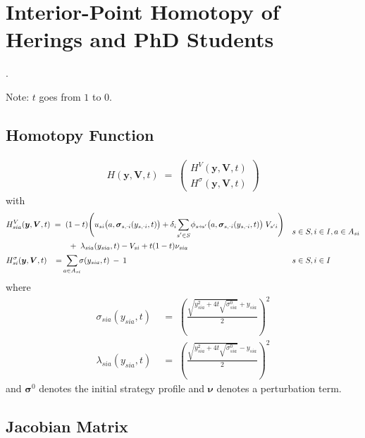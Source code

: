 \documentclass[11pt,fleqn]{article}
\newcommand{\bsigma}{\bm{\sigma}}
\newcommand{\bV}{\bm{V}}
\newcommand{\bnu}{\bm{\nu}}
\newcommand{\by}{\bm{y}}
\newcommand{\shortminus}{{\text{\scalebox{0.4}[1.0]{\(-\)}}}}
\newcommand{\minusi}{\shortminus i}
\newcommand{\shortrightarrow}{\parbox{4pt}{\tikz{\draw[->](0,0)--(4pt,0);}}}
\newcommand{\phiss}{\phi_{s\shortrightarrow s'}}
\begin{document}
\newpage
\section{Interior-Point Homotopy of Herings and PhD Students}

\citep*{Heringsetal2021}.

Note: $t$ goes from $1$ to $0$.

\subsection*{Homotopy Function}

\begin{align*}
	H(\by,\bV,t) \;=\;
	\begin{pmatrix} 
		H^{V}(\by,\bV,t) \\ 
		H^{\sigma}(\by,\bV,t) 
	\end{pmatrix}
\end{align*}
with
\begin{align*}
	& \begin{aligned}
		H^V_{sia}(\by,\bV,t) & \;=\; (1-t) \Biggl( u_{si}\bigl(a,\bsigma_{s,\minusi}(y_{s,\minusi},t)\bigr) + \delta_i \sum\limits_{\mathclap{s'\in S}} \phiss\bigl(a,\bsigma_{s,\minusi}(y_{s,\minusi},t)\bigr) \; V_{s'i} \Biggr) \\
		& \qquad \;+\; \lambda_{sia}(y_{sia}, t) - V_{si} + t(1-t) \nu_{sia}
	\end{aligned} && s\in S, i\in I, a\in A_{si} \\
	& H^\sigma_{si}(\by,\bV,t) \;\; \;=\; \sum\limits_{\mathclap{a\in A_{si}}} \sigma(y_{sia},t) \:-\: 1 && s\in S, i\in I
\end{align*}
where
\begin{align*}
	\sigma_{sia}(y_{sia}, t) & \;=\; \left( \frac{\sqrt{y_{sia}^2+4t\sqrt{\sigma^0_{sia}}} + y_{sia}}{2} \right)^2 \\
	\lambda_{sia}(y_{sia}, t) & \;=\; \left( \frac{\sqrt{y_{sia}^2+4t\sqrt{\sigma^0_{sia}}} - y_{sia}}{2} \right)^2
\end{align*}
and $\bsigma^0$ denotes the initial strategy profile and $\bnu$ denotes a perturbation term.


\subsection*{Jacobian Matrix}
\end{document}
